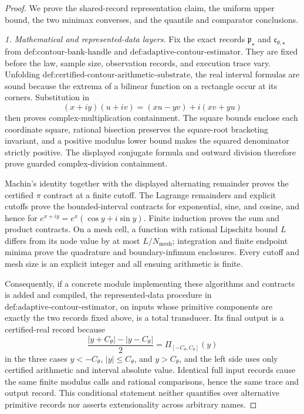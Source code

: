 \documentclass{article}
\begin{document}
\begin{proof}
We prove the shared-record representation claim, the uniform upper bound,
the two minimax converses, and the quantile and comparator conclusions.

\emph{1. Mathematical and represented-data layers.}
Fix the exact records \(\mathfrak p_{\star}\) and
\(\mathfrak c_{\theta,\star}\) from
\(\text{def:contour-bank-handle}\) and
\(\text{def:adaptive-contour-estimator}\).  They are fixed before the law,
sample size, observation records, and execution trace vary.  Unfolding
\(\text{def:certified-contour-arithmetic-substrate}\), the real interval
formulas are sound because the extrema of a bilinear function on a rectangle
occur at its corners.  Substitution in
\[
 (x+iy)(u+iv)=(xu-yv)+i(xv+yu)
\]
then proves complex-multiplication containment.  The square bounds enclose
each coordinate square, rational bisection preserves the square-root
bracketing invariant, and a positive modulus lower bound makes the squared
denominator strictly positive.  The displayed conjugate formula and outward
division therefore prove guarded complex-division containment.

Machin's identity together with the displayed alternating remainder proves
the certified \(\pi\) contract at a finite cutoff.  The Lagrange remainders
and explicit cutoffs prove the bounded-interval contracts for exponential,
sine, and cosine, and hence for
\(e^{x+iy}=e^x(\cos y+i\sin y)\).  Finite induction proves the sum and
product contracts.  On a mesh cell, a function with rational Lipschitz bound
\(L\) differs from its node value by at most
\(L/N_{\mathrm{mesh}}\); integration and finite endpoint minima prove the
quadrature and boundary-infimum enclosures.  Every cutoff and mesh size is
an explicit integer and all ensuing arithmetic is finite.

Consequently, if a concrete module implementing these algorithms and
contracts is added and compiled, the represented-data procedure in
\(\text{def:adaptive-contour-estimator}\), on inputs whose primitive
components are exactly the two records fixed above, is a total transducer.
Its final output is a certified-real record because
\[
 \frac{|y+C_{\theta}|-|y-C_{\theta}|}{2}
 =\Pi_{[-C_{\theta},C_{\theta}]}(y)                               \tag{1}
\]
in the three cases \(y<-C_{\theta}\),
\(|y|\le C_{\theta}\), and \(y>C_{\theta}\), and the left side uses only
certified arithmetic and interval absolute value.  Identical full input
records cause the same finite modulus calls and rational comparisons, hence
the same trace and output record.  This conditional statement neither
quantifies over alternative primitive records nor asserts extensionality
across arbitrary names.


\end{proof}
\end{document}
